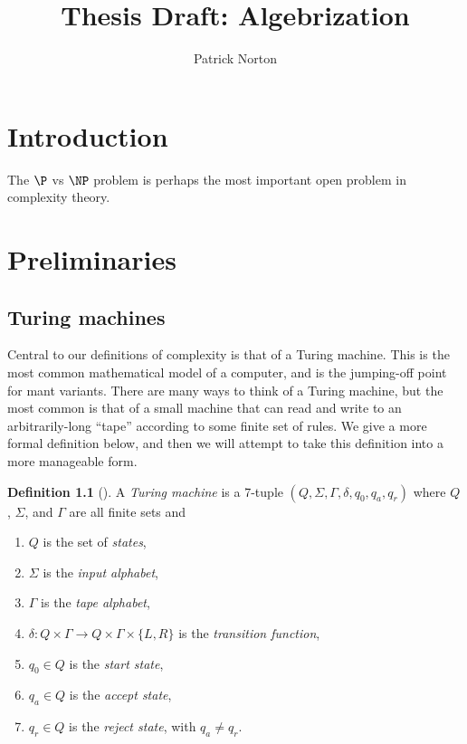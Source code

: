 \documentclass{reedthesis}
\title{Thesis Draft: Algebrization}
\author{Patrick Norton}
\theoremstyle{plain}
\theoremstyle{definition}
\newtheorem{defn}[thm]{Definition}
\theoremstyle{remark}
\numberwithin{equation}{section}
\begin{document}
\maketitle

\tableofcontents


\chapter*{Introduction}

The $\P$ vs $\NP$ problem is perhaps the most important open problem in
complexity theory.

\chapter{Preliminaries}


\section{Turing machines}


Central to our definitions of complexity is that of a Turing machine. This is
the most common mathematical model of a computer, and is the jumping-off point
for mant variants. There are many ways to think of a Turing machine, but the
most common is that of a small machine that can read and write to an
arbitrarily-long ``tape'' according to some finite set of rules. We give a more
formal definition below, and then we will attempt to take this definition into a
more manageable form.
\begin{defn}[{\cite[Def.\ 3.1]{Sip97}}]\label{def:TM}
  A \emph{Turing machine} is a 7-tuple $(Q, \Sigma, \Gamma, \delta, q_{0}, q_{a}, q_{r})$ where
  $Q$, $\Sigma$, and $\Gamma$ are all finite sets and
  \begin{enumerate}
    \item $Q$ is the set of \emph{states},
    \item $\Sigma$ is the \emph{input alphabet},
    \item $\Gamma$ is the \emph{tape alphabet},
    \item $\delta: Q \times \Gamma \rightarrow Q \times \Gamma \times \{L, R\}$ is the \emph{transition function},
    \item $q_{0} \in Q$ is the \emph{start state},
    \item $q_{a} \in Q$ is the \emph{accept state},
    \item $q_{r} \in Q$ is the \emph{reject state}, with $q_{a} \ne q_{r}$.
  \end{enumerate}
\end{defn}
\end{document}
